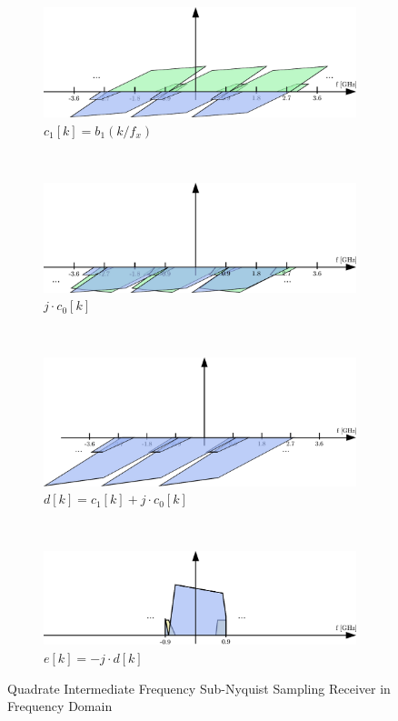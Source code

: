 \begin{figure}[h!]
\begin{subfigure}{0.45\textwidth}
    \centering
    \includegraphics[width=\textwidth]{figures/rx_2_freq_c_1}
    \caption{$c_1[k] = b_1(k / f_x)$}
    \label{fig:rx_2_freq_c_1}
  \end{subfigure}
  \vspace{4ex} \\
  \begin{subfigure}{0.45\textwidth}
    \centering
    \includegraphics[width=\textwidth]{figures/rx_2_freq_jc0}
    \caption{$j \cdot c_0[k]$}
    \label{fig:rx_2_freq_jc0}
  \end{subfigure}
  ~
  \begin{subfigure}{0.45\textwidth}
    \centering
    \includegraphics[width=\textwidth]{figures/rx_2_freq_d}
    \caption{$d[k] = c_1[k] + j \cdot c_0[k]$}
    \label{fig:rx_2_freq_d}
  \end{subfigure}
  \vspace{4ex} \\
  \begin{subfigure}{0.45\textwidth}
    \centering
    \includegraphics[width=\textwidth]{figures/rx_2_freq_e}
    \caption{$e[k] = -j \cdot d[k]$}
    \label{fig:rx_2_freq_e}
  \end{subfigure}
  \caption{Quadrate Intermediate Frequency Sub-Nyquist Sampling Receiver
    in Frequency Domain}
  \label{fig:rx_2_freq}
\end{figure}
